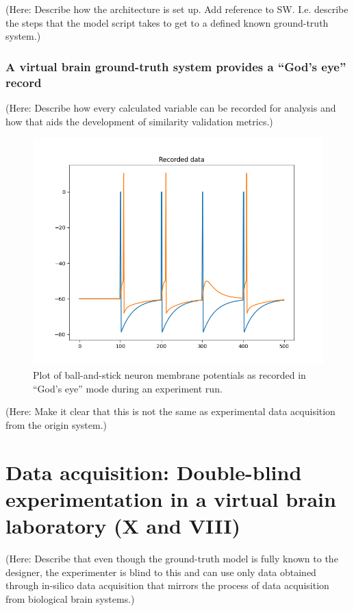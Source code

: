 \documentclass{ldr-article}
\begin{document}
(Here: Describe how the architecture is set up. Add reference to SW. I.e. describe the steps that the model script takes to get to a defined known ground-truth system.)

\subsubsection{A virtual brain ground-truth system provides a ``God's eye'' record}

(Here: Describe how every calculated variable can be recorded for analysis and how that aids the development of similarity validation metrics.)

\begin{figure}
    \centering
    \includegraphics[width=1\linewidth]{figures/e0_bs_recorded.png}
    \caption{Plot of ball-and-stick neuron membrane potentials as recorded in ``God's eye'' mode during an experiment run.
}
    \label{fig:ball-and-stick}
\end{figure}

(Here: Make it clear that this is not the same as experimental data acquisition from the origin system.)

\section{Data acquisition: Double-blind experimentation in a virtual brain laboratory (X and VIII)}

(Here: Describe that even though the ground-truth model is fully known to the designer, the experimenter is blind to this and can use only data obtained through in-silico data acquisition that mirrors the process of data acquisition from biological brain systems.)
\end{document}
